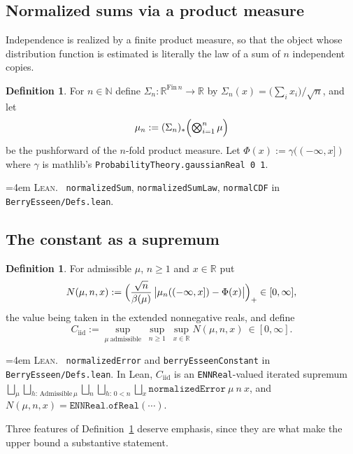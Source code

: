 \documentclass[10pt,a4paper]{article}
\theoremstyle{plain}
\theoremstyle{definition}
\newtheorem{definition}[theorem]{Definition}
\newcommand{\R}{\mathbb{R}}
\newcommand{\N}{\mathbb{N}}
\newcommand{\Cii}{C_{\mathrm{iid}}}
\newcommand{\lean}[1]{\texttt{#1}}
\newcommand{\file}[1]{\texttt{#1}}
\newenvironment{leanref}%
  {\par\addvspace{3pt}\begingroup\sloppy\emergencystretch=4em
   \noindent\footnotesize\textsc{Lean.}\ \ignorespaces}%
  {\par\endgroup\addvspace{3pt}}
\begin{document}
\subsection{Normalized sums via a product measure}

Independence is realized by a finite product measure, so that the object whose
distribution function is estimated is literally the law of a sum of $n$
independent copies.

\begin{definition}\label{def:sumlaw}
For $n\in\N$ define $\Sigma_n:\R^{\mathrm{Fin}\,n}\to\R$ by
$\Sigma_n(x) = \bigl(\sum_{i}x_i\bigr)/\sqrt n$, and let
\[
  \mu_n := (\Sigma_n)_{*}\Bigl(\textstyle\bigotimes_{i=1}^{n}\mu\Bigr)
\]
be the pushforward of the $n$-fold product measure. Let
$\Phi(x) := \gamma(({-\infty},x])$ where $\gamma$ is mathlib's
\lean{ProbabilityTheory.gaussianReal 0 1}.
\end{definition}

\begin{leanref}
\lean{normalizedSum}, \lean{normalizedSumLaw}, \lean{normalCDF} in
\file{BerryEsseen/Defs.lean}.
\end{leanref}

\subsection{The constant as a supremum}

\begin{definition}\label{def:constant}
For admissible $\mu$, $n\ge1$ and $x\in\R$ put
\[
  N(\mu,n,x) := \Bigl(
    \frac{\sqrt n}{\beta(\mu)}\,\bigl|\mu_n(({-\infty},x]) - \Phi(x)\bigr|
  \Bigr)_{+} \in[0,\infty] ,
\]
the value being taken in the extended nonnegative reals, and define
\[
  \Cii := \sup_{\mu\ \mathrm{admissible}} \ \sup_{n\ge1}\ \sup_{x\in\R}
  N(\mu,n,x) \ \in[0,\infty] .
\]
\end{definition}

\begin{leanref}
\lean{normalizedError} and \lean{berryEsseenConstant} in
\file{BerryEsseen/Defs.lean}. In Lean, $\Cii$ is an
\lean{ENNReal}-valued iterated supremum
$\bigsqcup_\mu\bigsqcup_{h:\,\mathrm{Admissible}\,\mu}\bigsqcup_n
\bigsqcup_{h:\,0<n}\bigsqcup_x \lean{normalizedError}\ \mu\ n\ x$, and
$N(\mu,n,x)=\lean{ENNReal.ofReal}(\cdots)$.
\end{leanref}

Three features of Definition~\ref{def:constant} deserve emphasis, since they
are what make the upper bound a substantive statement.
\end{document}
